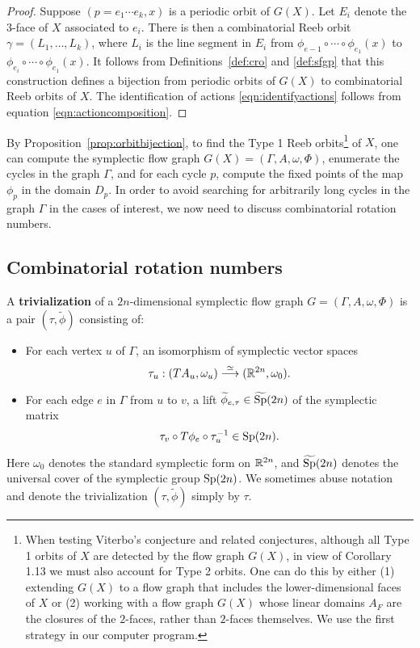 \begin{proof}
Suppose $(p=e_1\cdots e_k,x)$ is a periodic orbit of $G(X)$. Let $E_i$ denote the $3$-face of $X$ associated to $e_i$. There is then a combinatorial Reeb orbit $\gamma=(L_1,\ldots,L_k)$, where $L_i$ is the line segment in $E_i$ from $\phi_{e-1}\circ\cdots\circ \phi_{e_1}(x)$ to $\phi_{e_i}\circ\cdots\circ \phi_{e_1}(x)$. It follows from Definitions~\ref{def:cro} and \ref{def:sfgp} that this construction defines a bijection from periodic orbits of $G(X)$ to combinatorial Reeb orbits of $X$. The identification of actions \eqref{eqn:identifyactions} follows from equation \eqref{eqn:actioncomposition}.
\end{proof}

By Proposition~\ref{prop:orbitbijection}, to find the Type 1 Reeb orbits\footnote{When testing Viterbo's conjecture and related conjectures,
although all Type 1 orbits of $X$ are detected by the flow graph $G(X)$, in view of Corollary 1.13 we must also account for Type 2 orbits. One can do this by either (1) extending $G(X)$ to a flow graph that includes the lower-dimensional faces of $X$ or (2) working with a flow graph $G(X)$ whose linear domains $A_F$  are the closures of the $2$-faces, rather than $2$-faces themselves. We use the first strategy in our computer program.} of $X$, one can compute the symplectic flow graph $G(X)=(\Gamma,A,\omega,\Phi)$, enumerate the cycles in the graph $\Gamma$, and for each cycle $p$, compute the fixed points of the map $\phi_p$ in the domain $D_p$. In order to avoid searching for arbitrarily long cycles in the graph $\Gamma$ in the cases of interest, we now need to discuss combinatorial rotation numbers.

\subsection{Combinatorial rotation numbers}

\begin{definition}
\label{def:sfg_trivialization}
A {\bf trivialization} of a $2n$-dimensional symplectic flow graph $G=(\Gamma,A,\omega,\Phi)$ is a pair $(\tau,\widetilde{\phi})$ consisting of:
\begin{itemize}
  \item For each vertex $u$ of $\Gamma$, an isomorphism of symplectic vector spaces
  \[
  \tau_u:(TA_u,\omega_u) \stackrel{\simeq}{\longrightarrow} ({\mathbb R}^{2n},\omega_0).
  \]
  \item For each edge $e$ in $\Gamma$ from $u$ to $v$, a lift $\widetilde{\phi}_{e,\tau} \in \widetilde{\operatorname{Sp}}(2n)$ of the symplectic matrix
  \[
  \tau_v \circ T\phi_e \circ \tau_u^{-1}\in\operatorname{Sp}(2n).
  \]
\end{itemize}
Here $\omega_0$ denotes the standard symplectic form on ${\mathbb R}^{2n}$, and $\widetilde{\operatorname{Sp}}(2n)$ denotes the universal cover of the symplectic group $\operatorname{Sp}(2n)$. We sometimes abuse notation and denote the trivialization $(\tau,\widetilde{\phi})$ simply by $\tau$.
\end{definition}

